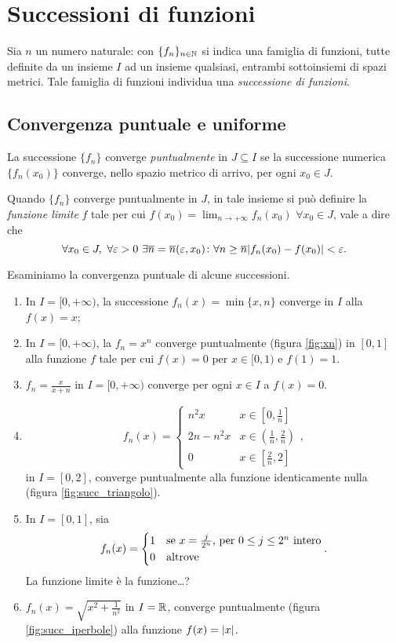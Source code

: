 \chapter{Successioni di funzioni}
Sia $n$ un numero naturale: con $\{f_n\}_{n\in\mathbb{N}}$ si indica una famiglia di funzioni, tutte definite da un insieme $I$ ad un insieme qualsiasi, entrambi sottoinsiemi di spazi metrici. Tale famiglia di funzioni individua una \emph{successione di funzioni}.
\section{Convergenza puntuale e uniforme}
\begin{definizione} \label{d:conv_puntuale_succ}
La successione $\{f_n\}$ converge \emph{puntualmente} in $J\subseteq I$ se la successione numerica $\{f_n(x_0)\}$ converge, nello spazio metrico di arrivo, per ogni $x_0\in J$.
\end{definizione}
Quando $\{f_n\}$ converge puntualmente in $J$, in tale insieme si può definire la \emph{funzione limite} $f$ tale per cui $f(x_0)=\lim_{n\to+\infty}f_n(x_0)$ $\forall x_0\in J$, vale a dire che
\begin{equation} \label{eq:conv_puntuale_succ}
\forall x_0\in J,\ \forall\epsilon>0\ \exists\overline{n}=\overline{n}(\epsilon,x_0)\colon\forall n\geq\overline{n}\abs{f_n(x_0)-f(x_0)}<\epsilon.
\end{equation}
\begin{esempio} \label{es:convergenza-puntuale-successioni}
	Esaminiamo la convergenza puntuale di alcune successioni.
	\begin{enumerate}
		\item In $I=[0,+\infty)$, la successione $f_n(x)=\min\{x,n\}$ converge in $I$ alla $f(x)=x$;
		\item In $I=[0,+\infty)$, la $f_n=x^n$ converge puntualmente (figura \ref{fig:xn}) in $[0,1]$ alla funzione $f$ tale per cui $f(x)=0$ per $x\in[0,1)$ e $f(1)=1$.
		
		\item $f_n=\frac{x}{x+n}$ in $I=[0,+\infty)$ converge per ogni $x\in I$ a $f(x)=0$.
		\item\[
		f_n(x)=\begin{cases}n^2x&x\in[0,\frac1{n}]\\ 2n-n^2x&x\in(\frac1{n},\frac2{n})\\ 0&x\in[\frac2{n},2]\end{cases},
		\]
		in $I=[0,2]$, converge puntualmente alla funzione identicamente nulla (figura \ref{fig:succ_triangolo}).
		
		\item In $I=[0,1]$, sia
		\[
		f_n(x)=\begin{cases*}1&se $x=\frac{j}{2^n}$, per $0\leq j\leq 2^n$ intero\\ 0&altrove\end{cases*}.
		\]
		La funzione limite è la funzione\dots?
		\item $f_n(x)=\sqrt{x^2+\frac1{n^2}}$ in $I=\mathbb{R}$, converge puntualmente (figura \ref{fig:succ_iperbole}) alla funzione $f(x)=\lvert x\rvert$.
		
	\end{enumerate}
\end{esempio}
